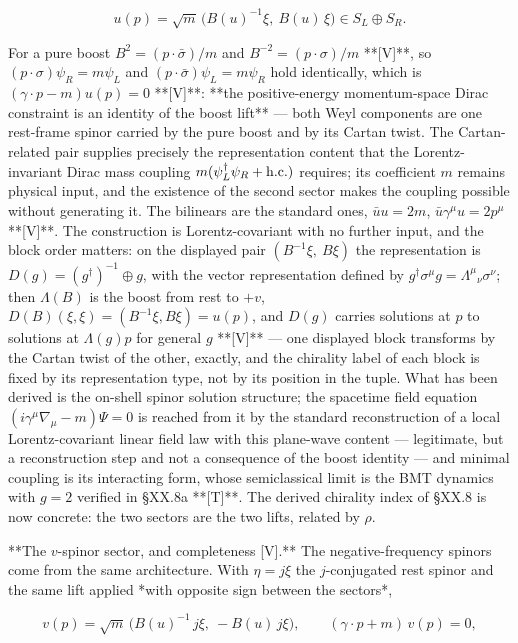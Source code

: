 $$u(p) = \sqrt m\,\big(B(u)^{-1}\xi,\ B(u)\,\xi\big)\in S_L\oplus S_R.$$

For a pure boost $B^2 = (p\cdot\bar\sigma)/m$ and $B^{-2} = (p\cdot\sigma)/m$ **[V]**, so $(p\cdot\sigma)\psi_R = m\psi_L$ and $(p\cdot\bar\sigma)\psi_L = m\psi_R$ hold identically, which is $(\gamma\cdot p-m)u(p) = 0$ **[V]**: **the positive-energy momentum-space Dirac constraint is an identity of the boost lift** — both Weyl components are one rest-frame spinor carried by the pure boost and by its Cartan twist. The Cartan-related pair supplies precisely the representation content that the Lorentz-invariant Dirac mass coupling $m(\psi_L^\dagger\psi_R+{\rm h.c.})$ requires; its coefficient $m$ remains physical input, and the existence of the second sector makes the coupling possible without generating it. The bilinears are the standard ones, $\bar uu = 2m$, $\bar u\gamma^\mu u = 2p^\mu$ **[V]**. The construction is Lorentz-covariant with no further input, and the block order matters: on the displayed pair $(B^{-1}\xi,\ B\xi)$ the representation is $D(g) = (g^\dagger)^{-1}\oplus g$, with the vector representation defined by $g^\dagger\sigma^\mu g = \Lambda^\mu{}_\nu\sigma^\nu$; then $\Lambda(B)$ is the boost from rest to $+v$, $D(B)(\xi,\xi) = (B^{-1}\xi,B\xi) = u(p)$, and $D(g)$ carries solutions at $p$ to solutions at $\Lambda(g)p$ for general $g$ **[V]** — one displayed block transforms by the Cartan twist of the other, exactly, and the chirality label of each block is fixed by its representation type, not by its position in the tuple. What has been derived is the on-shell spinor solution structure; the spacetime field equation $(i\gamma^\mu\nabla_\mu-m)\Psi = 0$ is reached from it by the standard reconstruction of a local Lorentz-covariant linear field law with this plane-wave content — legitimate, but a reconstruction step and not a consequence of the boost identity — and minimal coupling is its interacting form, whose semiclassical limit is the BMT dynamics with $g = 2$ verified in §XX.8a **[T]**. The derived chirality index of §XX.8 is now concrete: the two sectors are the two lifts, related by $\rho$.

**The $v$-spinor sector, and completeness [V].** The negative-frequency spinors come from the same architecture. With $\eta = j\xi$ the $j$-conjugated rest spinor and the same lift applied *with opposite sign between the sectors*,

$$v(p) = \sqrt m\,\big(B(u)^{-1}\,j\xi,\ -B(u)\,j\xi\big),\qquad (\gamma\cdot p+m)\,v(p) = 0,$$

